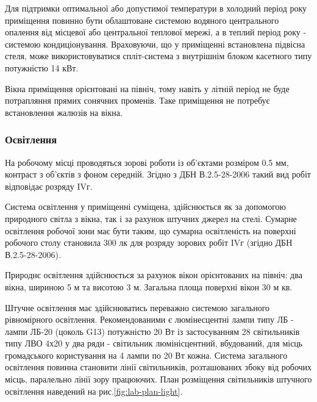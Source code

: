     Для підтримки оптимальної або допустимої температури в холодний період року приміщення повинно бути облаштоване системою водяного центрального опалення від місцевої або центральної теплової мережі, а в теплий період року - системою кондиціонування. Враховуючи, що у приміщенні встановлена підвісна стеля, може використовуватися спліт-система з внутрішнім блоком касетного типу потужністю 14 кВт.

    Вікна приміщення орієнтовані на північ, тому навіть у літній період не буде потрапляння прямих сонячних променів. Таке приміщення не потребує встановлення жалюзів на вікна.

    \subsubsection{Освітлення}

    На робочому місці проводяться зорові роботи із об'єктами розміром 0.5 мм, контраст з об'єктів з фоном середній. Згідно з ДБН В.2.5-28-2006\cite{lab-dbn28} такий вид робіт відповідає розряду IVг.

    Система освітлення у приміщенні суміщена, здійснюється як за допомогою природного світла з вікна, так і за рахунок штучних джерел на стелі. Сумарне освітлення робочої зони має бути таким, що сумарна освітленість на поверхні робочого столу становила 300 лк для розряду зорових робіт IVг (згідно ДБН В.2.5-28-2006\cite{lab-dbn28}).

    Природнє освітлення здійснюється за рахунок вікон орієнтованих на північ: два вікна, шириною 5 м та висотою 3 м. Загальна площа поверхні вікон 30 м кв.

    Штучне освітлення має здійснюватись переважно системою загального рівномірного освітлення. Рекомендованими є люмінесцентні лампи типу ЛБ - лампи ЛБ-20 (цоколь G13) потужністю 20 Вт із застосуванням 28 світильників типу ЛВО 4х20 у два ряди - світильник люмінісцентний, вбудований, для місць громадського користування на 4 лампи по 20 Вт кожна.
    Система загального освітлення повинна становити лінії світильників, розташованих збоку від робочих місць, паралельно лінії зору працюючих. План розміщення світильників штучного освітлення наведений на рис.\ref{fig:lab-plan-light}.

